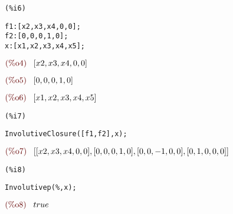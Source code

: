\noindent
\begin{minipage}[t]{8ex}
\color{red}\bf
\begin{verbatim}
(%i6) 
\end{verbatim}
\end{minipage}
\begin{minipage}[t]{\textwidth}
\color{blue}
\begin{verbatim}
f1:[x2,x3,x4,0,0];
f2:[0,0,0,1,0];
x:[x1,x2,x3,x4,x5];
\end{verbatim}
\end{minipage}
\begin{math}\displaystyle
\parbox{8ex}{\color{labelcolor}(\%o4) }
[x2,x3,x4,0,0]
\end{math}

\noindent
\begin{math}\displaystyle
\parbox{8ex}{\color{labelcolor}(\%o5) }
[0,0,0,1,0]
\end{math}

\noindent
\begin{math}\displaystyle
\parbox{8ex}{\color{labelcolor}(\%o6) }
[x1,x2,x3,x4,x5]
\end{math}


\noindent
\begin{minipage}[t]{8ex}
\color{red}\bf
\begin{verbatim}
(%i7) 
\end{verbatim}
\end{minipage}
\begin{minipage}[t]{\textwidth}
\color{blue}
\begin{verbatim}
InvolutiveClosure([f1,f2],x);
\end{verbatim}
\end{minipage}
\begin{math}\displaystyle
\parbox{8ex}{\color{labelcolor}(\%o7) }
[[x2,x3,x4,0,0],[0,0,0,1,0],[0,0,-1,0,0],[0,1,0,0,0]]
\end{math}


\noindent
\begin{minipage}[t]{8ex}
\color{red}\bf
\begin{verbatim}
(%i8) 
\end{verbatim}
\end{minipage}
\begin{minipage}[t]{\textwidth}
\color{blue}
\begin{verbatim}
Involutivep(%,x);
\end{verbatim}
\end{minipage}
\begin{math}\displaystyle
\parbox{8ex}{\color{labelcolor}(\%o8) }
true
\end{math}
